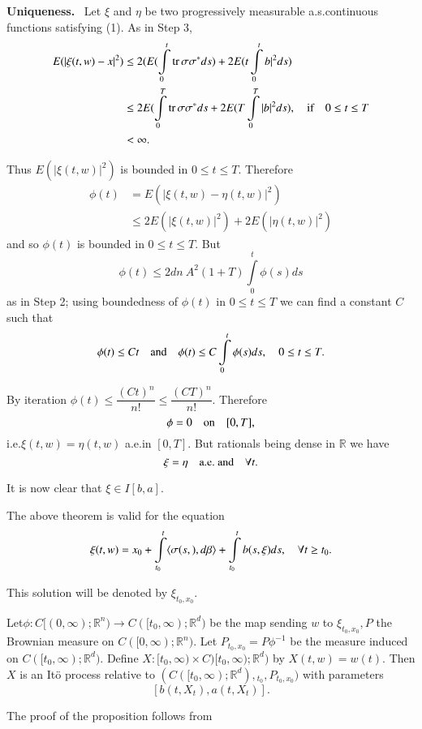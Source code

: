 \noindent
{\bf Uniqueness.}~ Let $\xi$ and $\eta$ be two progressively
measurable a.s.\@ continuous functions satisfying (1). As in Step 3,
\begin{align*}
E(|\xi(t,w)-x|^{2}) &\leq 2(E(\int\limits^{t}_{0}\operatorname{tr}
\sigma\sigma^{*}ds)+2E(t\int\limits^{t}_{0}b|^{2}ds)\\
&\leq 2E(\int\limits^{T}_{0}\operatorname{tr}
\sigma\sigma^{*}ds+2E(T\int\limits^{T}_{0}|b|^{2}ds),\quad\text{if}\quad
0\leq t\leq T\\
&< \infty.
\end{align*}\pageoriginale

Thus $E(|\xi(t,w)|^{2})$ is bounded in $0\leq t\leq T$. Therefore
\begin{align*}
\phi(t) &= E(|\xi(t,w)-\eta(t,w)|^{2})\\
&\leq 2E(|\xi(t,w)|^{2})+2E(|\eta(t,w)|^{2})
\end{align*}
and so $\phi(t)$ is bounded in $0\leq t\leq T$. But
$$
\phi(t)\leq 2dn\ A^{2}(1+T)\int\limits^{t}_{0}\phi(s)ds
$$
as in Step 2; using boundedness of $\phi(t)$ in $0\leq t\leq T$ we can
find a constant $C$ such that
$$
\phi(t)\leq Ct\quad\text{and}\quad \phi(t)\leq
C\int\limits^{t}_{0}\phi(s)ds,\quad 0\leq t\leq T.
$$

By iteration $\phi(t)\leq \dfrac{(Ct)^{n}}{n!}\leq
\dfrac{(CT)^{n}}{n!}$. Therefore
$$
\phi=0\quad \text{on}\quad [0,T],
$$
i.e.\@ $\xi(t,w)=\eta(t,w)$ a.e.\@ in $[0,T]$. But rationals being
dense in $\mathbb{R}$ we have
$$
\xi=\eta\quad\text{a.e.\ and}\quad \forall t.
$$

It is now clear that $\xi \in I[b,a]$.

\begin{remark*}
The above theorem is valid for the equation
$$
\xi(t,w)=x_{0}+\int\limits^{t}_{t_{0}}\langle \sigma(s,),d\beta\rangle
+\int\limits^{t}_{t_{0}}b(s,\xi)ds,\quad \forall t\geq t_{0}.
$$

This solution will be denoted by $\xi_{t_{0},x_{0}}$.
\end{remark*}

\begin{prop*}
Let\pageoriginale $\phi:C[(0,\infty);\mathbb{R}^{n})\to
  C([t_{0},\infty);\mathbb{R}^{d})$ be the map sending $w$ to
    $\xi_{t_{0},x_{0}},P$ the Brownian measure on
    $C([0,\infty);\mathbb{R}^{n})$. Let $P_{t_{0},x_{0}}=P\phi^{-1}$
      be the measure induced on
      $C([t_{0},\infty);\mathbb{R}^{d})$. Define
        $X:[t_{0},\infty)\times C)[t_{0},\infty);\mathbb{R}^{d})$ by
            $X(t,w)=w(t)$. Then $X$ is an It\"o process relative to
            $(C([t_{0},\infty);\mathbb{R}^{d}), {}_{t_{0}},
              P_{t_{0},x_{0}})$ with parameters
$$
[b(t,X_{t}),a(t,X_{t})].
$$

The proof of the proposition follows from 
\end{prop*}

